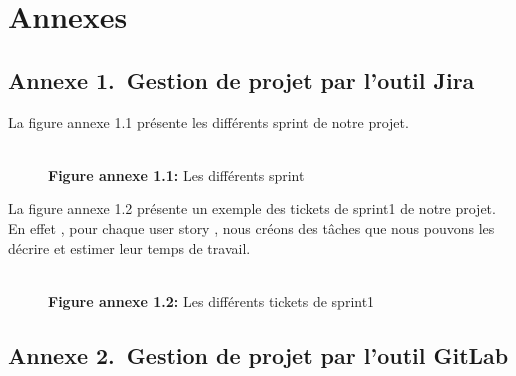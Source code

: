 \chapter*{Annexes}


\section*{Annexe 1.~Gestion de projet par l'outil Jira}
La figure annexe 1.1 présente les différents sprint de notre projet.
\begin{figure}[htpb]
    \centering
    {\\\textbf{Figure annexe 1.1:} Les différents sprint}
\end{figure}
\vspace{8mm}

La figure annexe 1.2 présente un exemple des tickets de sprint1 de notre projet.\newline
En effet , pour chaque user story , nous créons des tâches que nous pouvons les décrire et estimer leur temps de travail. 
\begin{figure}[htpb]
    \centering
    {\\\textbf{Figure annexe 1.2:} Les différents tickets de sprint1}
\end{figure}


\newpage

\section*{Annexe 2.~Gestion de projet par l'outil GitLab}

